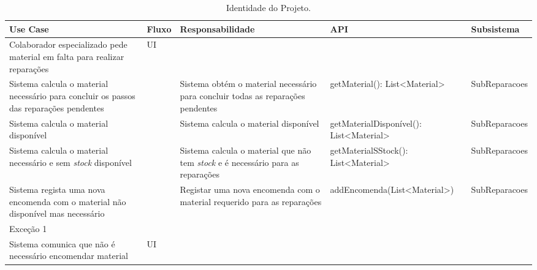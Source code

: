 \documentclass[../relatorio.tex]{subfiles}
\begin{document}
\begin{landscape}
    \begin{table}[!h]
        \centering
        \begin{tabular}{|p{5cm}|p{1cm}|p{4cm}|p{6cm}|p{3cm}|}
            \hline
            \rowcolor{gray!20!white}
            Use Case & Fluxo & Responsabilidade & API & Subsistema \\
            \hline
            \rowcolor{yellow}
            Colaborador especializado pede material em falta para realizar reparações
                     & UI
                     &
                     &
                     &
            \\
            \hline
            Sistema calcula o material necessário para concluir os passos das reparações pendentes
                     &
                     & Sistema obtém o material necessário para concluir todas as reparações pendentes
                     & getMaterial(): List<Material>
                     & SubReparacoes
            \\
            \hline
            Sistema calcula o material disponível
                     &
                     & Sistema calcula o material disponível
                     & getMaterialDisponível(): List<Material>
                     & SubReparacoes
            \\
            \hline
            Sistema calcula o material necessário e sem \textit{stock} disponível
                     &
                     & Sistema calcula o material que não tem \textit{stock} e é necessário para as reparações
                     & getMaterialSStock(): List<Material>
                     & SubReparacoes
            \\
            \hline
            Sistema regista uma nova encomenda com o material não disponível mas necessário
                     &
                     & Registar uma nova encomenda com o material requerido para as reparações	
                     & addEncomenda(List<Material>)
                     & SubReparacoes
            \\
            \hline
            \rowcolor{red!30}
            Exceção 1 &   &   &    & \\
            \hline
            \rowcolor{yellow}
            Sistema comunica que não é necessário encomendar material
                    & UI
                    &
                    &
                    &
            \\
            \hline
        \end{tabular}
        \caption{Identidade do Projeto.}
    \end{table}
\end{landscape}
\end{document}
